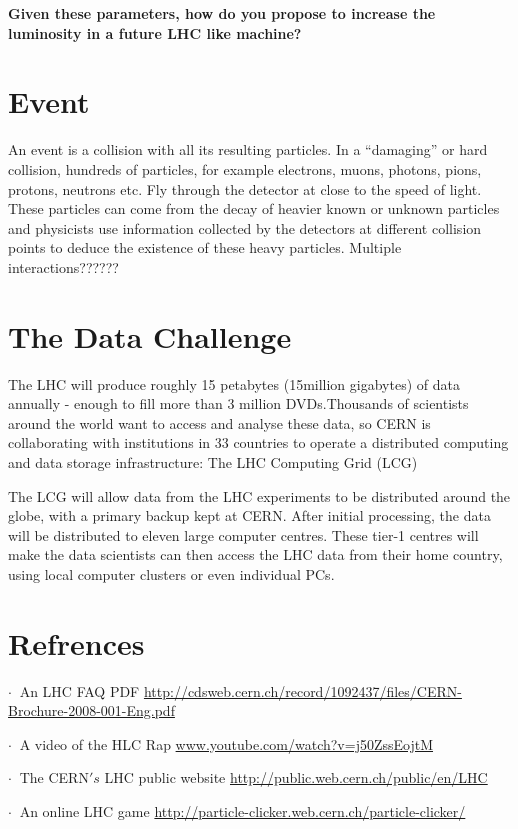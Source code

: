 \;
\;

\noindent
\textbf{Given these parameters, how do you propose to increase the luminosity in a future LHC like machine?}

\;
\;

\section{Event}

\noindent
An event is a collision with all its resulting particles. In a ``damaging''  or hard collision, hundreds of particles, for example electrons, muons, photons, pions, protons, neutrons etc. Fly through the detector at close to the speed of light. These particles can come from the decay of heavier known or unknown particles and physicists use information collected by the detectors at different collision points to deduce the existence of these heavy particles. Multiple interactions??????

\;
\;

\section{The Data Challenge}

\noindent
The LHC will produce roughly 15 petabytes (15million gigabytes) of data annually - enough to fill more than 3 million DVDs.Thousands of scientists around the world want to access and analyse these data, so CERN is collaborating with institutions in 33 countries to operate a distributed computing and data storage infrastructure: The LHC Computing Grid (LCG)

\;
\;

\noindent
The LCG will allow data from the LHC experiments to be distributed around the globe, with a primary backup kept at CERN. After initial processing, the data will be distributed to eleven large computer centres. These tier-1 centres will make the data scientists can then access the LHC data from their home country, using local computer clusters or even individual PCs.

\;
\;

\section{Refrences}

\;

          $ \cdot \:$ An LHC FAQ PDF \url{http://cdsweb.cern.ch/record/1092437/files/CERN-Brochure-2008-001-Eng.pdf}

\;
\noindent
          $ \cdot \:$  A video of the HLC Rap \url{www.youtube.com/watch?v=j50ZssEojtM}

\;
\noindent
          $ \cdot \:$ The CERN$'s$ LHC public website \url{http://public.web.cern.ch/public/en/LHC}

\;
\noindent
          $ \cdot \:$ An online LHC game \url{http://particle-clicker.web.cern.ch/particle-clicker/}


\;
